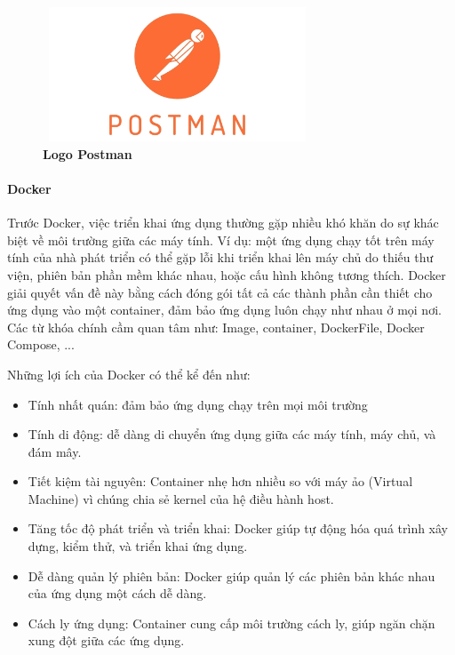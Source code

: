 \begin{figure}[H]
	\centering
	\includegraphics[width=8cm,height=4cm]{Images/Technology/postman.jpg}
	\caption[Logo Postman]{\bfseries \fontsize{12pt}{0pt}
		\selectfont Logo Postman}
	\label{postman} %
\end{figure}


\paragraph{Docker}
\mbox{}

Trước Docker, việc triển khai ứng dụng thường gặp nhiều khó khăn do sự khác biệt về môi trường giữa các máy tính. Ví dụ: một ứng dụng chạy tốt trên máy tính của nhà phát triển có thể gặp lỗi khi triển khai lên máy chủ do thiếu thư viện, phiên bản phần mềm khác nhau, hoặc cấu hình không tương thích. Docker giải quyết vấn đề này bằng cách đóng gói tất cả các thành phần cần thiết cho ứng dụng vào một container, đảm bảo ứng dụng luôn chạy như nhau ở mọi nơi. Các từ khóa chính cầm quan tâm như: Image, container, DockerFile, Docker Compose, ...

Những lợi ích của Docker có thể kể đến như:
\begin{itemize}
	\item Tính nhất quán: đảm bảo ứng dụng chạy trên mọi môi trường
	\item Tính di động: dễ dàng di chuyển ứng dụng giữa các máy tính, máy chủ, và đám mây.
	\item Tiết kiệm tài nguyên: Container nhẹ hơn nhiều so với máy ảo (Virtual Machine) vì chúng chia sẻ kernel của hệ điều hành host.
	\item Tăng tốc độ phát triển và triển khai: Docker giúp tự động hóa quá trình xây dựng, kiểm thử, và triển khai ứng dụng.
	\item Dễ dàng quản lý phiên bản: Docker giúp quản lý các phiên bản khác nhau của ứng dụng một cách dễ dàng.
	\item Cách ly ứng dụng: Container cung cấp môi trường cách ly, giúp ngăn chặn xung đột giữa các ứng dụng.
\end{itemize}

